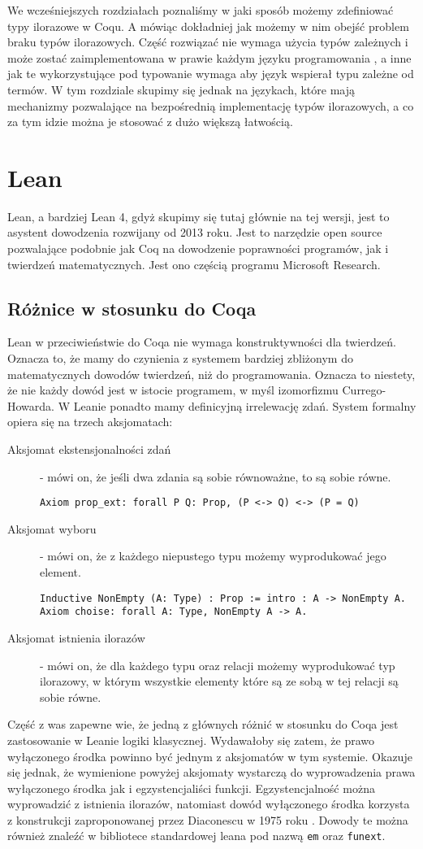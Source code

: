 We wcześniejszych rozdziałach poznaliśmy w jaki sposób możemy zdefiniować typy ilorazowe w Coqu. A mówiąc dokładniej jak możemy w nim obejść problem braku typów ilorazowych. Część rozwiązać nie wymaga użycia typów zależnych i może zostać zaimplementowana w prawie każdym języku programowania , a inne jak te wykorzystujące pod typowanie wymaga aby język wspierał typu zależne od termów. W tym rozdziale skupimy się jednak na językach, które mają mechanizmy pozwalające na bezpośrednią implementację typów ilorazowych, a co za tym idzie można je stosować z dużo większą łatwością.
\section{Lean}
Lean, a bardziej Lean 4, gdyż skupimy się tutaj głównie na tej wersji, jest to asystent dowodzenia rozwijany od 2013 roku. Jest to narzędzie open source pozwalające podobnie jak Coq na dowodzenie poprawności programów, jak i twierdzeń matematycznych. Jest ono częścią programu Microsoft Research.
\subsection{Różnice w stosunku do Coqa}
Lean w przeciwieństwie do Coqa nie wymaga konstruktywności dla twierdzeń\cite{lean4}. Oznacza to, że mamy do czynienia z systemem bardziej zbliżonym do matematycznych dowodów twierdzeń, niż do programowania. Oznacza to niestety, że nie każdy dowód jest w istocie programem, w myśl izomorfizmu Currego-Howarda. W Leanie ponadto mamy definicyjną irrelewację zdań. System formalny opiera się na trzech aksjomatach:
\begin{description}
    \item[Aksjomat ekstensjonalności zdań] - mówi on, że jeśli dwa zdania są sobie równoważne, to są sobie równe.
    \begin{verbatim}
Axiom prop_ext: forall P Q: Prop, (P <-> Q) <-> (P = Q)
    \end{verbatim}
    \item[Aksjomat wyboru] - mówi on, że z każdego niepustego typu możemy wyprodukować jego element.
    \begin{verbatim}
Inductive NonEmpty (A: Type) : Prop := intro : A -> NonEmpty A.
Axiom choise: forall A: Type, NonEmpty A -> A.
    \end{verbatim}
    \item[Aksjomat istnienia ilorazów] - mówi on, że dla każdego typu oraz relacji możemy wyprodukować typ ilorazowy, w którym wszystkie elementy które są ze sobą w tej relacji są sobie równe.
\end{description}
Część z was zapewne wie, że jedną z głównych różnić w stosunku do Coqa jest zastosowanie w Leanie logiki klasycznej. Wydawałoby się zatem, że prawo wyłączonego środka powinno być jednym z aksjomatów w tym systemie. Okazuje się jednak, że wymienione powyżej aksjomaty wystarczą do wyprowadzenia prawa wyłączonego środka jak i egzystencjaliści funkcji. Egzystencjalność można wyprowadzić z istnienia ilorazów, natomiast dowód wyłączonego środka korzysta z konstrukcji zaproponowanej przez Diaconescu w 1975 roku \cite{choise}. Dowody te można również znaleźć w bibliotece standardowej leana pod nazwą \texttt{em} oraz \texttt{funext}.

